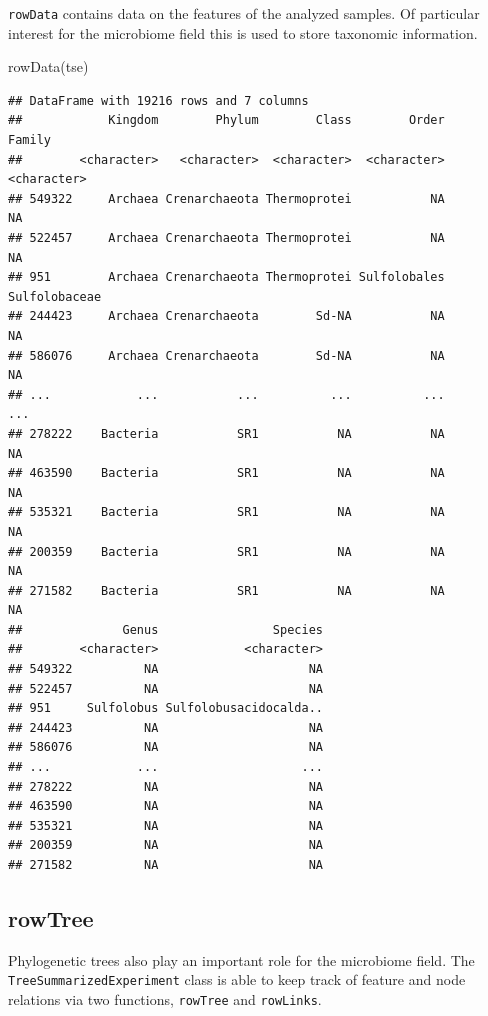 \documentclass[
]{book}
\newenvironment{Shaded}{\begin{snugshade}}{\end{snugshade}}
\newcommand{\FunctionTok}[1]{\textcolor[rgb]{0.00,0.00,0.00}{#1}}
\newcommand{\NormalTok}[1]{#1}
\begin{document}
\texttt{rowData} contains data on the features of the analyzed samples. Of particular
interest for the microbiome field this is used to store taxonomic information.

\begin{Shaded}
\begin{Highlighting}[]
\FunctionTok{rowData}\NormalTok{(tse)}
\end{Highlighting}
\end{Shaded}

\begin{verbatim}
## DataFrame with 19216 rows and 7 columns
##            Kingdom        Phylum        Class        Order        Family
##        <character>   <character>  <character>  <character>   <character>
## 549322     Archaea Crenarchaeota Thermoprotei           NA            NA
## 522457     Archaea Crenarchaeota Thermoprotei           NA            NA
## 951        Archaea Crenarchaeota Thermoprotei Sulfolobales Sulfolobaceae
## 244423     Archaea Crenarchaeota        Sd-NA           NA            NA
## 586076     Archaea Crenarchaeota        Sd-NA           NA            NA
## ...            ...           ...          ...          ...           ...
## 278222    Bacteria           SR1           NA           NA            NA
## 463590    Bacteria           SR1           NA           NA            NA
## 535321    Bacteria           SR1           NA           NA            NA
## 200359    Bacteria           SR1           NA           NA            NA
## 271582    Bacteria           SR1           NA           NA            NA
##              Genus                Species
##        <character>            <character>
## 549322          NA                     NA
## 522457          NA                     NA
## 951     Sulfolobus Sulfolobusacidocalda..
## 244423          NA                     NA
## 586076          NA                     NA
## ...            ...                    ...
## 278222          NA                     NA
## 463590          NA                     NA
## 535321          NA                     NA
## 200359          NA                     NA
## 271582          NA                     NA
\end{verbatim}

\hypertarget{rowtree}{%
\subsection{rowTree}\label{rowtree}}

Phylogenetic trees also play an important role for the microbiome field. The
\texttt{TreeSummarizedExperiment} class is able to keep track of feature and node
relations via two functions, \texttt{rowTree} and \texttt{rowLinks}.
\end{document}
